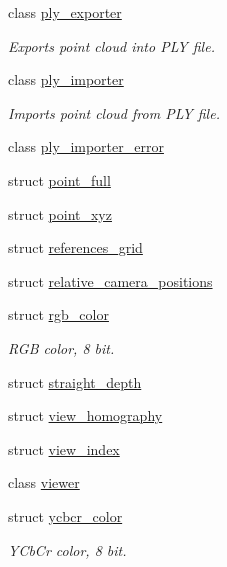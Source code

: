 \begin{DoxyCompactItemize}
\item 
class \hyperlink{classtlz_1_1ply__exporter}{ply\+\_\+exporter}
\begin{DoxyCompactList}\small\item\em Exports point cloud into P\+LY file. \end{DoxyCompactList}\item 
class \hyperlink{classtlz_1_1ply__importer}{ply\+\_\+importer}
\begin{DoxyCompactList}\small\item\em Imports point cloud from P\+LY file. \end{DoxyCompactList}\item 
class \hyperlink{classtlz_1_1ply__importer__error}{ply\+\_\+importer\+\_\+error}
\item 
struct \hyperlink{structtlz_1_1point__full}{point\+\_\+full}
\item 
struct \hyperlink{structtlz_1_1point__xyz}{point\+\_\+xyz}
\item 
struct \hyperlink{structtlz_1_1references__grid}{references\+\_\+grid}
\item 
struct \hyperlink{structtlz_1_1relative__camera__positions}{relative\+\_\+camera\+\_\+positions}
\item 
struct \hyperlink{structtlz_1_1rgb__color}{rgb\+\_\+color}
\begin{DoxyCompactList}\small\item\em R\+GB color, 8 bit. \end{DoxyCompactList}\item 
struct \hyperlink{structtlz_1_1straight__depth}{straight\+\_\+depth}
\item 
struct \hyperlink{structtlz_1_1view__homography}{view\+\_\+homography}
\item 
struct \hyperlink{structtlz_1_1view__index}{view\+\_\+index}
\item 
class \hyperlink{classtlz_1_1viewer}{viewer}
\item 
struct \hyperlink{structtlz_1_1ycbcr__color}{ycbcr\+\_\+color}
\begin{DoxyCompactList}\small\item\em Y\+Cb\+Cr color, 8 bit. \end{DoxyCompactList}\end{DoxyCompactItemize}
